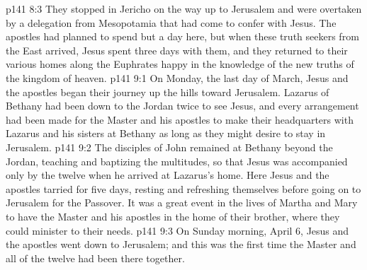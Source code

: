 \vs p141 8:3 They stopped in Jericho on the way up to Jerusalem and were overtaken by a delegation from Mesopotamia that had come to confer with Jesus. The apostles had planned to spend but a day here, but when these truth seekers from the East arrived, Jesus spent three days with them, and they returned to their various homes along the Euphrates happy in the knowledge of the new truths of the kingdom of heaven.
\vs p141 9:1 On Monday, the last day of March, Jesus and the apostles began their journey up the hills toward Jerusalem. Lazarus of Bethany had been down to the Jordan twice to see Jesus, and every arrangement had been made for the Master and his apostles to make their headquarters with Lazarus and his sisters at Bethany as long as they might desire to stay in Jerusalem.
\vs p141 9:2 The disciples of John remained at Bethany beyond the Jordan, teaching and baptizing the multitudes, so that Jesus was accompanied only by the twelve when he arrived at Lazarus’s home. Here Jesus and the apostles tarried for five days, resting and refreshing themselves before going on to Jerusalem for the Passover. It was a great event in the lives of Martha and Mary to have the Master and his apostles in the home of their brother, where they could minister to their needs.
\vs p141 9:3 On Sunday morning, April 6, Jesus and the apostles went down to Jerusalem; and this was the first time the Master and all of the twelve had been there together.
